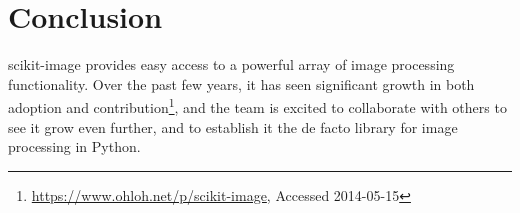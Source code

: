 
\section*{Conclusion}
  \label{sec:conclusion}

  scikit-image provides easy access to a powerful array of image processing functionality. Over the past few years, it has seen significant growth in both adoption and contribution\footnote{\url{https://www.ohloh.net/p/scikit-image}, Accessed 2014-05-15}, and the team is excited to collaborate with others to see it grow even further, and to establish it the de facto library for image processing in Python.
